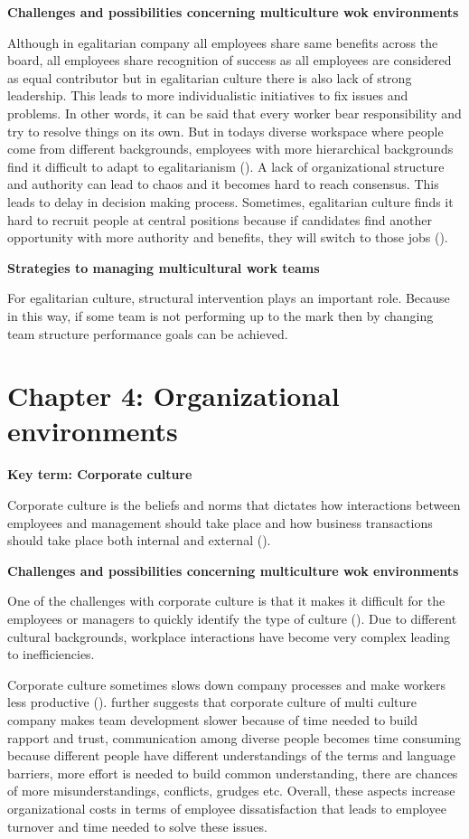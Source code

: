 \documentclass{article}
\begin{document}
\textbf{Challenges and possibilities concerning multiculture wok environments}

Although in egalitarian company all employees share same benefits across the board, all employees share recognition of success as all employees are considered as equal contributor but in egalitarian culture there is also lack of strong leadership. This leads to more individualistic initiatives to fix issues and problems. In other words, it can be said that every worker bear responsibility and try to resolve things on its own. But in todays diverse workspace where people come from different backgrounds, employees with more hierarchical backgrounds find it difficult to adapt to egalitarianism (\cite{steers2013management}). A lack of organizational structure and authority can lead to chaos and it becomes hard to reach consensus. This leads to delay in decision making process. Sometimes, egalitarian culture finds it hard to recruit people at central positions because if candidates find another opportunity with more authority and benefits, they will switch to those jobs (\cite{steckermeier2019better}).

\textbf{Strategies to managing multicultural work teams}

For egalitarian culture, structural intervention plays an important role. Because in this way, if some team is not performing up to the mark then by changing team structure performance goals can be achieved.


\section{Chapter 4: Organizational environments}
\textbf{Key term: Corporate culture}

Corporate culture is the beliefs and norms that dictates how interactions between employees and management should take place and how business transactions should take place both internal and external (\cite{steers2013management}).

\textbf{Challenges and possibilities concerning multiculture wok environments}

One of the challenges with corporate culture is that it makes it difficult for the employees or managers to quickly identify the type of culture (\cite{steers2013management}). Due to different cultural backgrounds, workplace interactions have become very complex leading to inefficiencies.

Corporate culture sometimes slows down company processes and make workers less productive (\cite{trefry2006double}). \cite{trefry2006double} further suggests that corporate culture of multi culture company makes team development slower because of time needed to build rapport and trust, communication among diverse people becomes time consuming because different people have different understandings of the terms and language barriers, more effort is needed to build common understanding, there are chances of more misunderstandings, conflicts, grudges etc. Overall, these aspects increase organizational costs in terms of employee dissatisfaction that leads to employee turnover and time needed to solve these issues.
\end{document}
